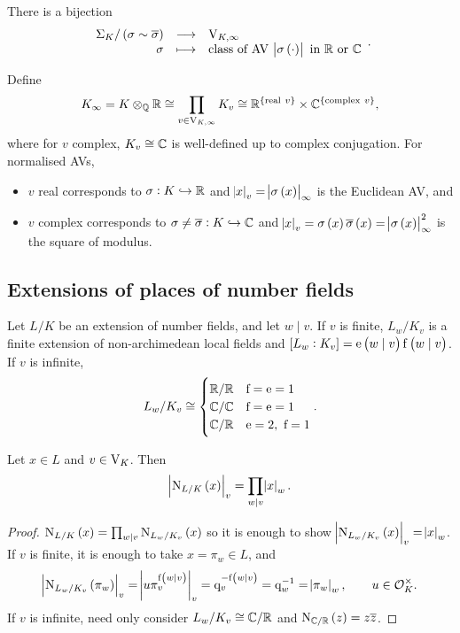 \begin{theorem}
There is a bijection
$$ \function{\Sigma_K / \br{\sigma \sim \overline{\sigma}}}{\V_{K, \infty}}{\sigma}{\text{class of AV} \ \abs{\sigma\br{\cdot}} \ \text{in} \ \RR \ \text{or} \ \CC}. $$
\end{theorem}

\pagebreak

\begin{notation*}
Define
$$ K_\infty = K \otimes_\QQ \RR \cong \prod_{v \in \V_{K, \infty}} K_v \cong \RR^{\cbr{\text{real} \ v}} \times \CC^{\cbr{\text{complex} \ v}}, $$
where for $ v $ complex, $ K_v \cong \mathbb{C} $ is well-defined up to complex conjugation. For normalised AVs,
\begin{itemize}
\item $ v $ real corresponds to $ \sigma : K \hookrightarrow \mathbb{R} $ and $ \abs{x}_v = \abs{\sigma\br{x}}_\infty $ is the Euclidean AV, and
\item $ v $ complex corresponds to $ \sigma \ne \overline{\sigma} : K \hookrightarrow \mathbb{C} $ and $ \abs{x}_v = \sigma\br{x}\overline{\sigma}\br{x} = \abs{\sigma\br{x}}_\infty^2 $ is the square of modulus.
\end{itemize}
\end{notation*}

\subsection{Extensions of places of number fields}

Let $ L / K $ be an extension of number fields, and let $ w \mid v $. If $ v $ is finite, $ L_w / K_v $ is a finite extension of non-archimedean local fields and $ \sbr{L_w : K_v} = \e\br{w \mid v}\f\br{w \mid v} $. If $ v $ is infinite,
$$ L_w / K_v \cong
\begin{cases}
\mathbb{R} / \mathbb{R} & \mathrm{f} = \mathrm{e} = 1 \\
\mathbb{C} / \mathbb{C} & \mathrm{f} = \mathrm{e} = 1 \\
\mathbb{C} / \mathbb{R} & \mathrm{e} = 2, \ \mathrm{f} = 1
\end{cases}.
$$


\begin{proposition}
Let $ x \in L $ and $ v \in \mathrm{V}_K $. Then
$$ \abs{\N_{L / K}\br{x}}_v = \prod_{w \mid v} \abs{x}_w. $$
\end{proposition}

\begin{proof}
$ \N_{L / K}\br{x} = \prod_{w \mid v} \N_{L_w / K_v}\br{x} $ so it is enough to show $ \abs{\N_{L_w / K_v}\br{x}}_v = \abs{x}_w $. If $ v $ is finite, it is enough to take $ x = \pi_w \in L $, and
$$ \abs{\N_{L_w / K_v}\br{\pi_w}}_v = \abs{u\pi_v^{\f\br{w \mid v}}}_v = \q_v^{-\f\br{w \mid v}} = \q_w^{-1} = \abs{\pi_w}_w, \qquad u \in \OOO_K^\times. $$
If $ v $ is infinite, need only consider $ L_w / K_v \cong \mathbb{C} / \mathbb{R} $ and $ \N_{\CC / \RR}\br{z} = z\overline{z} $.
\end{proof}

